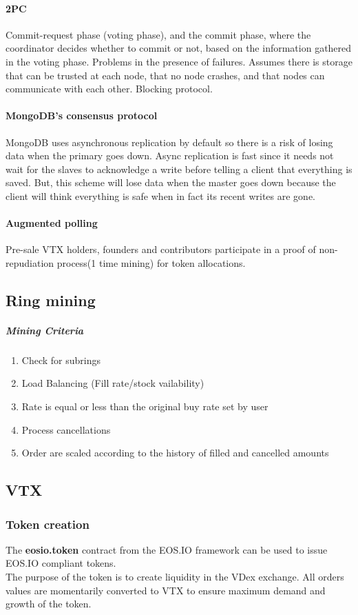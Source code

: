 \documentclass[]{article}
\begin{document}
\paragraph{2PC}
Commit-request phase (voting phase), and the commit phase, where the coordinator decides whether to commit or not, based on the information gathered in the voting phase. Problems in the presence of failures. Assumes there is storage that can be trusted at each node, that no node crashes, and that nodes can communicate with each other. Blocking protocol. 

\paragraph{MongoDB's consensus protocol}
MongoDB uses asynchronous replication by default so there is a risk of losing data when the primary goes down.
Async replication is fast since it needs not wait for the slaves to
acknowledge a write before telling a client that everything is saved.
But, this scheme will lose data when the master goes down because the
client will think everything is safe when in fact its recent writes
are gone. 

\paragraph{Augmented polling}
Pre-sale VTX holders, founders and contributors participate in a proof of non-repudiation process(1 time mining) for token allocations.


\subsection{Ring mining}
\subparagraph{Mining Criteria}
		\begin{enumerate}
		\item Check for subrings
		\item Load Balancing (Fill rate/stock vailability)
		\item Rate is equal or less than the original buy rate set by user
		\item Process cancellations
		\item Order are scaled according to the history of filled and cancelled amounts 
		\end{enumerate}		

\subsection{VTX}
\subsubsection{Token creation}
The \textbf{eosio.token} contract from the EOS.IO framework can be used to issue EOS.IO compliant tokens.\\
The purpose of the token is to create liquidity in the VDex exchange.
All orders values are momentarily converted to VTX to ensure maximum demand and growth of the token.\\ 
\end{document}
